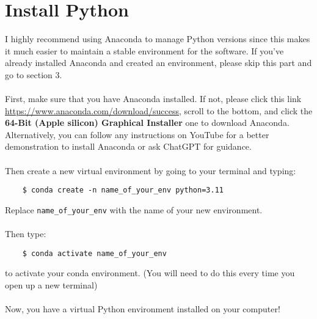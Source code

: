 \documentclass[12pt, english]{article}
\begin{document}
\section{Install Python}
I highly recommend using Anaconda to manage Python versions since this makes it much easier to maintain a stable environment for the software. If you've already installed Anaconda and created an environment, please skip this part and go to section 3. \\\\
First, make sure that you have Anaconda installed. If not, please click this link \url{https://www.anaconda.com/download/success}, scroll to the bottom, and click the \textbf{64-Bit (Apple silicon) Graphical Installer} one to download Anaconda. Alternatively, you can follow any instructions on YouTube for a better demonstration to install Anaconda or ask ChatGPT for guidance.\\\\
Then create a new virtual environment by going to your terminal and typing:
\begin{lstlisting}
    $ conda create -n name_of_your_env python=3.11
\end{lstlisting}
Replace \texttt{name\_of\_your\_env} with the name of your new environment. \\\\
Then type:
\begin{lstlisting}
    $ conda activate name_of_your_env
\end{lstlisting}
to activate your conda environment. (You will need to do this every time you open up a new terminal)\\\\
Now, you have a virtual Python environment installed on your computer!
\end{document}
